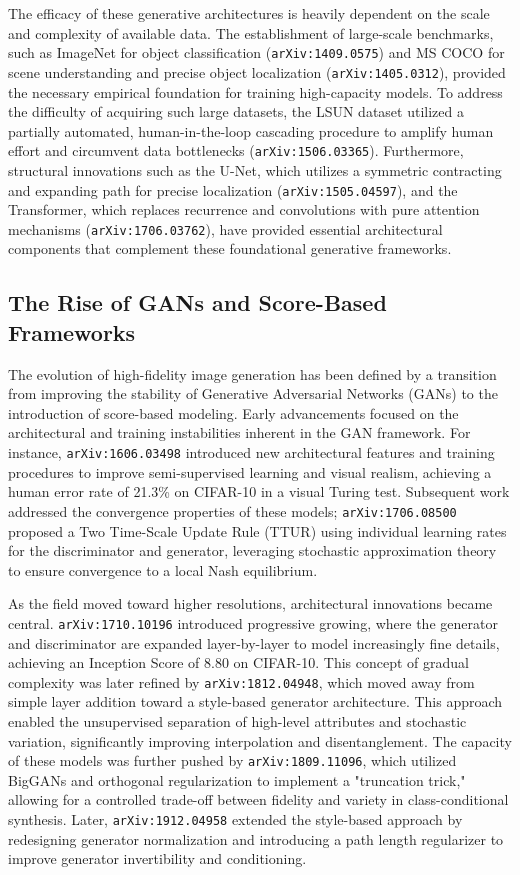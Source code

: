 \documentclass[11pt]{article}
\begin{document}
The efficacy of these generative architectures is heavily dependent on the scale and complexity of available data. The establishment of large-scale benchmarks, such as ImageNet for object classification (\texttt{arXiv:1409.0575}) and MS COCO for scene understanding and precise object localization (\texttt{arXiv:1405.0312}), provided the necessary empirical foundation for training high-capacity models. To address the difficulty of acquiring such large datasets, the LSUN dataset utilized a partially automated, human-in-the-loop cascading procedure to amplify human effort and circumvent data bottlenecks (\texttt{arXiv:1506.03365}). Furthermore, structural innovations such as the U-Net, which utilizes a symmetric contracting and expanding path for precise localization (\texttt{arXiv:1505.04597}), and the Transformer, which replaces recurrence and convolutions with pure attention mechanisms (\texttt{arXiv:1706.03762}), have provided essential architectural components that complement these foundational generative frameworks.

\subsection{The Rise of GANs and Score-Based Frameworks}

The evolution of high-fidelity image generation has been defined by a transition from improving the stability of Generative Adversarial Networks (GANs) to the introduction of score-based modeling. Early advancements focused on the architectural and training instabilities inherent in the GAN framework. For instance, \texttt{arXiv:1606.03498} introduced new architectural features and training procedures to improve semi-supervised learning and visual realism, achieving a human error rate of 21.3\% on CIFAR-10 in a visual Turing test. Subsequent work addressed the convergence properties of these models; \texttt{arXiv:1706.08500} proposed a Two Time-Scale Update Rule (TTUR) using individual learning rates for the discriminator and generator, leveraging stochastic approximation theory to ensure convergence to a local Nash equilibrium.

As the field moved toward higher resolutions, architectural innovations became central. \texttt{arXiv:1710.10196} introduced progressive growing, where the generator and discriminator are expanded layer-by-layer to model increasingly fine details, achieving an Inception Score of 8.80 on CIFAR-10. This concept of gradual complexity was later refined by \texttt{arXiv:1812.04948}, which moved away from simple layer addition toward a style-based generator architecture. This approach enabled the unsupervised separation of high-level attributes and stochastic variation, significantly improving interpolation and disentanglement. The capacity of these models was further pushed by \texttt{arXiv:1809.11096}, which utilized BigGANs and orthogonal regularization to implement a "truncation trick," allowing for a controlled trade-off between fidelity and variety in class-conditional synthesis. Later, \texttt{arXiv:1912.04958} extended the style-based approach by redesigning generator normalization and introducing a path length regularizer to improve generator invertibility and conditioning.
\end{document}

